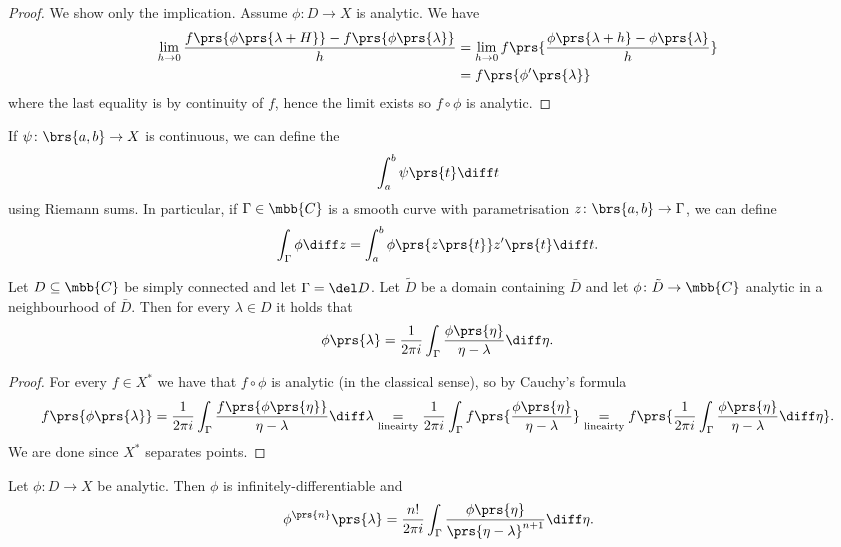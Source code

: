 \documentclass[10pt, twoside]{book}
\begin{document}
\begin{proof}
We show only the implication.
Assume $\phi \colon D \to X$ is analytic. We have
\begin{align*}
\lim_{h\to 0} \frac{f\prs{\phi\prs{\lambda + H}} - f\prs{\phi\prs{\lambda}}}{h}
&= \lim_{h\to 0} f \prs{\frac{\phi\prs{\lambda + h} - \phi\prs{\lambda}}{h}}
\\&= f\prs{\phi'\prs{\lambda}}
\end{align*}
where the last equality is by continuity of $f$, hence the limit exists so $f \circ \phi$ is analytic.
\end{proof}

\begin{remark}
If $\psi \colon \brs{a,b} \to X$ is continuous, we can define the 
\[\int_a^b \psi\prs{t} \diff t\]
using Riemann sums.
In particular, if $\Gamma \in \mbb{C}$ is a smooth curve with parametrisation $z \colon \brs{a,b} \to \Gamma$, we can define
\[\int_\Gamma \phi \diff z = \int_a^b \phi\prs{z\prs{t}} z'\prs{t} \diff t \text{.}\]
\end{remark}

\begin{proposition}
Let $D \subseteq \mbb{C}$ be simply connected and let $\Gamma = \del D$. Let $\tilde{D}$ be a domain containing $\bar{D}$ and let $\phi \colon \tilde{D} \to \mbb{C}$ analytic in a neighbourhood of $\bar{D}$. Then for every $\lambda \in D$ it holds that
\[\phi\prs{\lambda} = \frac{1}{2 \pi i} \int_\Gamma \frac{\phi\prs{\eta}}{\eta - \lambda} \diff \eta \text{.}\]
\end{proposition}

\begin{proof}
For every $f \in X^*$ we have that $f \circ \phi$ is analytic (in the classical sense), so by Cauchy's formula
\[f \prs{\phi\prs{\lambda}} = \frac{1}{2 \pi i} \int_\Gamma \frac{f\prs{\phi\prs{\eta}}}{\eta - \lambda} \diff \lambda \underset{\text{lineairty}}{=} \frac{1}{2 \pi i} \int_\Gamma f\prs{\frac{\phi\prs{\eta}}{\eta - \lambda}} \underset{\text{lineairty}}{=} f\prs{\frac{1}{2 \pi i} \int_\Gamma \frac{\phi\prs{\eta}}{\eta - \lambda} \diff \eta} \text{.}\]
We are done since $X^*$ separates points.
\end{proof}

\begin{corollary}
Let $\phi \colon D \to X$ be analytic. Then $\phi$ is infinitely-differentiable and
\[\phi^{\prs{n}}\prs{\lambda} = \frac{n!}{2 \pi i}\int_\Gamma \frac{\phi\prs{\eta}}{\prs{\eta - \lambda}^{n+1}} \diff \eta \text{.}\]
\end{corollary}
\end{document}
